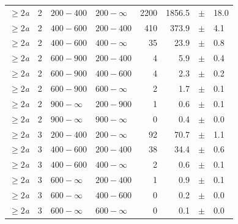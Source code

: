 \begin{table}[!h]
\begin{tabular}{rrllrrcl}
$\geq 2${\it a}\T & 2 & $ 200- 400$ & $200-\infty$ &   2200 &   1856.5 &$\pm$&   18.0 \\
$\geq 2${\it a}\T & 2 & $ 400- 600$ & $200-400$ &    410 &    373.9 &$\pm$&    4.1 \\
$\geq 2${\it a} & 2 & $ 400- 600$ & $400-\infty$ &     35 &     23.9 &$\pm$&    0.8 \\
$\geq 2${\it a}\T & 2 & $ 600- 900$ & $200-400$ &      4 &      5.9 &$\pm$&    0.4 \\
$\geq 2${\it a} & 2 & $ 600- 900$ & $400-600$ &      4 &      2.3 &$\pm$&    0.2 \\
$\geq 2${\it a} & 2 & $ 600- 900$ & $600-\infty$ &      2 &      1.7 &$\pm$&    0.1 \\
$\geq 2${\it a}\T & 2 & $ 900- \infty$ & $200-900$ &      1 &      0.6 &$\pm$&    0.1 \\
$\geq 2${\it a} & 2 & $ 900- \infty$ & $900-\infty$ &      0 &      0.4 &$\pm$&    0.0 \\
$\geq 2${\it a}\T & 3 & $ 200- 400$ & $200-\infty$ &     92 &     70.7 &$\pm$&    1.1 \\
$\geq 2${\it a}\T & 3 & $ 400- 600$ & $200-400$ &     38 &     34.4 &$\pm$&    0.6 \\
$\geq 2${\it a} & 3 & $ 400- 600$ & $400-\infty$ &      2 &      0.6 &$\pm$&    0.1 \\
$\geq 2${\it a}\T & 3 & $ 600- \infty$ & $200-400$ &      1 &      0.9 &$\pm$&    0.1 \\
$\geq 2${\it a} & 3 & $ 600- \infty$ & $400-600$ &      0 &      0.2 &$\pm$&    0.0 \\
$\geq 2${\it a} & 3 & $ 600- \infty$ & $600-\infty$ &      0 &      0.1 &$\pm$&    0.0 \\
    \hline
  \end{tabular}
\end{table}

